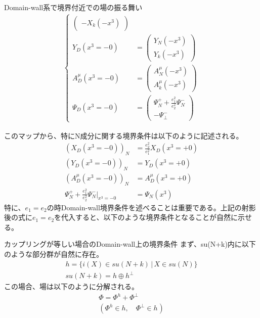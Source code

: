 \documentclass[dvipdfmx,a4paper,10.5pt]{article}
\numberwithin{equation}{section}
\begin{document}
\begin{enumerate}
\begin{resultbox}{Domain-wall系で境界付近での場の振る舞い}
\begin{align*}
\begin{cases}
\begin{pmatrix}
                -X_{k}(-x^{3})
            \end{pmatrix}\\
            Y_{D}(x^{3}=- 0)&=\begin{pmatrix}
                Y_{N}(-x^{3})\\
                Y_{k}(-x^{3})
            \end{pmatrix}\\
            A^{\mu}_{D}(x^{3}=- 0)&=\begin{pmatrix}
                A^{\mu}_{N}(-x^{3})\\
                A^{\mu}_{k}(-x^{3})
            \end{pmatrix}\\
            \Psi_{D}(x^{3}=- 0)&=\begin{pmatrix}
                \Psi^{+}_{N}+\frac{e_{1}^{2}}{e_{2}^{2}}\Psi^{-}_{N} \\-\Psi_{\perp}^{-}
            \end{pmatrix}
        \end{cases}
    \end{align*}
\end{resultbox}
このマップから、特にN成分に関する境界条件は以下のように記述される。
\begin{align*}
    (X_{D}(x^{3}=-0))_{N}&=\frac{e_{2}^{2}}{e_{1}^{2}}X_{D}(x^{3}=+0)\\
    (Y_{D}(x^{3}=-0))_{N}&=Y_{D}(x^{3}=+0)\\
    (A^{\mu}_{D}(x^{3}=-0))_{N}&=A^{\mu}_{D}(x^{3}=+0)\\
    \Psi^{+}_{N}+\frac{e_{1}^{2}}{e_{2}^{2}}\Psi^{-}_{N}|_{x^{3}=-0}&=\Psi_{N}(x^{3})
\end{align*}
特に、$e_{1}=e_{2}$の時Domain-wall境界条件を述べることは重要である。上記の射影後の式に$e_{1}=e_{2}$を代入すると、以下のような境界条件となることが自然に示せる。
\begin{resultbox}{カップリングが等しい場合のDomain-wall上の境界条件}
    まず、su(N+k)内に以下のような部分群が自然に存在。
    \begin{gather*}
        h=\{i(X)\in su(N+k)\,|\,X\in su(N)\}\\
        su(N+k)=h\oplus h^{\perp}
    \end{gather*}
    この場合、場は以下のように分解される。
    \begin{gather*}
        \Phi=\Phi^{h}+\Phi^{\perp}\\
        (\Phi^{h}\in h,\quad \Phi^{\perp}\in h^{})
    \end{gather*}

\end{resultbox}
\end{enumerate}
\end{document}
